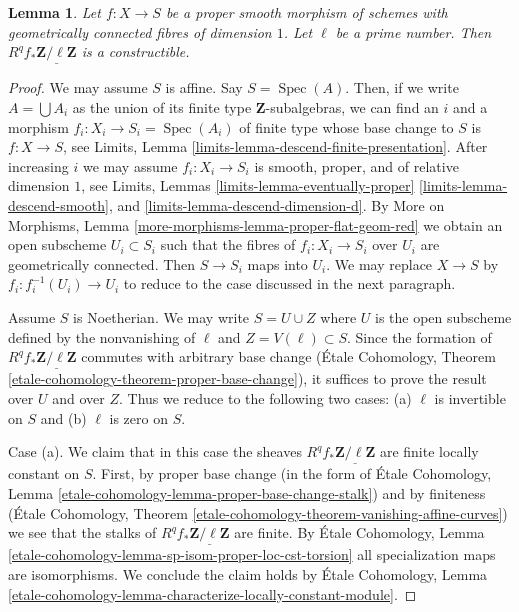 \documentclass{stacks-project}
\theoremstyle{plain}
\newtheorem{lemma}[subsection]{Lemma}
\theoremstyle{definition}
\theoremstyle{remark}
\numberwithin{equation}{subsection}
\def\Spec{\mathop{\mathrm{Spec}}}
\begin{document}
\begin{lemma}
\label{lemma-proper-smooth-family-curves}
Let $f : X \to S$ be a proper smooth morphism of schemes with
geometrically connected fibres of dimension $1$. Let $\ell$
be a prime number. Then $R^qf_*\underline{\mathbf{Z}/\ell\mathbf{Z}}$
is a constructible.
\end{lemma}

\begin{proof}
We may assume $S$ is affine. Say $S = \Spec(A)$. Then, if we write
$A = \bigcup A_i$ as the union of its finite type $\mathbf{Z}$-subalgebras,
we can find an $i$ and a morphism $f_i : X_i \to S_i = \Spec(A_i)$ of finite
type whose base change to $S$ is $f : X \to S$, see
Limits, Lemma \ref{limits-lemma-descend-finite-presentation}.
After increasing $i$ we may assume $f_i : X_i \to S_i$ is
smooth, proper, and of relative dimension $1$, see
Limits, Lemmas
\ref{limits-lemma-eventually-proper}
\ref{limits-lemma-descend-smooth}, and
\ref{limits-lemma-descend-dimension-d}.
By More on Morphisms, Lemma \ref{more-morphisms-lemma-proper-flat-geom-red}
we obtain an open subscheme $U_i \subset S_i$ such that the fibres
of $f_i : X_i \to S_i$ over $U_i$ are geometrically connected.
Then $S \to S_i$ maps into $U_i$. We may replace $X \to S$
by $f_i : f_i^{-1}(U_i) \to U_i$ to reduce to the case
discussed in the next paragraph.

\medskip\noindent
Assume $S$ is Noetherian. We may write $S = U \cup Z$ where $U$ is the
open subscheme defined by the nonvanishing of $\ell$ and
$Z = V(\ell) \subset S$. Since the formation of
$R^qf_*\underline{\mathbf{Z}/\ell\mathbf{Z}}$ commutes with arbitrary
base change (\'Etale Cohomology, Theorem
\ref{etale-cohomology-theorem-proper-base-change}),
it suffices to prove the result over $U$ and over $Z$.
Thus we reduce to the following two cases: (a) $\ell$
is invertible on $S$ and (b) $\ell$ is zero on $S$.

\medskip\noindent
Case (a). We claim that in this case the sheaves
$R^qf_*\underline{\mathbf{Z}/\ell\mathbf{Z}}$ are
finite locally constant on $S$. First, by proper base change
(in the form of \'Etale Cohomology, Lemma
\ref{etale-cohomology-lemma-proper-base-change-stalk})
and by finiteness 
(\'Etale Cohomology, Theorem
\ref{etale-cohomology-theorem-vanishing-affine-curves})
we see that the stalks of $R^qf_*\underline{\mathbf{Z}/\ell\mathbf{Z}}$
are finite. By \'Etale Cohomology, Lemma
\ref{etale-cohomology-lemma-sp-isom-proper-loc-cst-torsion}
all specialization maps are isomorphisms.
We conclude the claim holds by
\'Etale Cohomology, Lemma
\ref{etale-cohomology-lemma-characterize-locally-constant-module}.


\end{proof}
\end{document}
